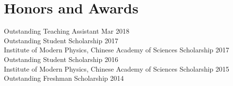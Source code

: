 \documentclass[letterpaper,11pt]{article} %
\begin{document}
\section{Honors and Awards}

\begin{itemize}[leftmargin=0.5cm, label={}]
    \small{\item{
     {Outstanding Teaching Assistant} \hfill Mar 2018\\
     {Outstanding Student Scholarship} \hfill 2017\\
     {Institute of Modern Physics, Chinese Academy of Sciences Scholarship} \hfill {2017}\\
     {Outstanding Student Scholarship} \hfill 2016\\
     {Institute of Modern Physics, Chinese Academy of Sciences Scholarship} \hfill {2015}\\
     {Outstanding Freshman Scholarship} \hfill 2014
    }}
 \end{itemize}
\end{document}
